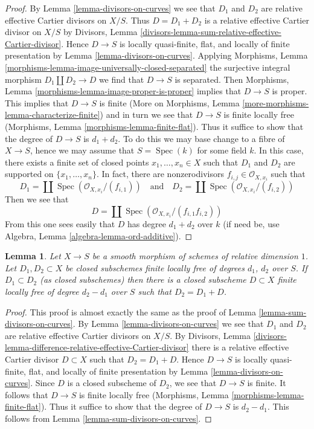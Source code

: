 \documentclass{stacks-project}
\theoremstyle{plain}
\newtheorem{lemma}[subsection]{Lemma}
\theoremstyle{definition}
\theoremstyle{remark}
\numberwithin{equation}{subsection}
\def\Spec{\mathop{\mathrm{Spec}}}
\begin{document}
\begin{proof}
By Lemma \ref{lemma-divisors-on-curves} we see that $D_1$
and $D_2$ are relative effective Cartier divisors on $X/S$.
Thus $D = D_1 + D_2$ is a relative effective Cartier divisor
on $X/S$ by
Divisors, Lemma \ref{divisors-lemma-sum-relative-effective-Cartier-divisor}.
Hence $D \to S$ is locally quasi-finite, flat, and
locally of finite presentation by
Lemma \ref{lemma-divisors-on-curves}.
Applying
Morphisms, Lemma \ref{morphisms-lemma-image-universally-closed-separated}
the surjective integral morphism $D_1 \amalg D_2 \to D$
we find that $D \to S$ is separated. Then
Morphisms, Lemma \ref{morphisms-lemma-image-proper-is-proper}
implies that $D \to S$ is proper.
This implies that $D \to S$ is finite
(More on Morphisms, Lemma \ref{more-morphisms-lemma-characterize-finite})
and in turn we see that $D \to S$ is finite locally free
(Morphisms, Lemma \ref{morphisms-lemma-finite-flat}).
Thus it suffice to show that the degree of $D \to S$ is $d_1 + d_2$.
To do this we may base change to a fibre of $X \to S$, hence we may
assume that $S = \Spec(k)$ for some field $k$.
In this case, there exists a finite set of closed points
$x_1, \ldots, x_n \in X$ such that $D_1$ and $D_2$
are supported on $\{x_1, \ldots, x_n\}$.
In fact, there are nonzerodivisors $f_{i, j} \in \mathcal{O}_{X, x_i}$
such that
$$
D_1 = \coprod \Spec(\mathcal{O}_{X, x_i}/(f_{i, 1}))
\quad\text{and}\quad
D_2 = \coprod \Spec(\mathcal{O}_{X, x_i}/(f_{i, 2}))
$$
Then we see that
$$
D = \coprod \Spec(\mathcal{O}_{X, x_i}/(f_{i, 1}f_{i, 2}))
$$
From this one sees easily that $D$ has degree $d_1 + d_2$
over $k$ (if need be, use Algebra, Lemma \ref{algebra-lemma-ord-additive}).
\end{proof}

\begin{lemma}
\label{lemma-difference-divisors-on-curves}
Let $X \to S$ be a smooth morphism of schemes of relative dimension $1$.
Let $D_1, D_2 \subset X$ be closed subschemes finite locally free of
degrees $d_1$, $d_2$ over $S$. If $D_1 \subset D_2$ (as closed subschemes)
then there is a closed subscheme $D \subset X$ finite locally free of
degree $d_2 - d_1$ over $S$ such that $D_2 = D_1 + D$.
\end{lemma}

\begin{proof}
This proof is almost exactly the same as the proof of
Lemma \ref{lemma-sum-divisors-on-curves}.
By Lemma \ref{lemma-divisors-on-curves} we see that $D_1$
and $D_2$ are relative effective Cartier divisors on $X/S$.
By Divisors, Lemma
\ref{divisors-lemma-difference-relative-effective-Cartier-divisor}
there is a relative effective Cartier divisor $D \subset X$
such that $D_2 = D_1 + D$. Hence $D \to S$ is locally quasi-finite, flat, and
locally of finite presentation by
Lemma \ref{lemma-divisors-on-curves}.
Since $D$ is a closed subscheme of $D_2$, we see that
$D \to S$ is finite. It follows that $D \to S$ is finite locally free
(Morphisms, Lemma \ref{morphisms-lemma-finite-flat}).
Thus it suffice to show that the degree of $D \to S$ is $d_2 - d_1$.
This follows from Lemma \ref{lemma-sum-divisors-on-curves}.
\end{proof}
\end{document}
